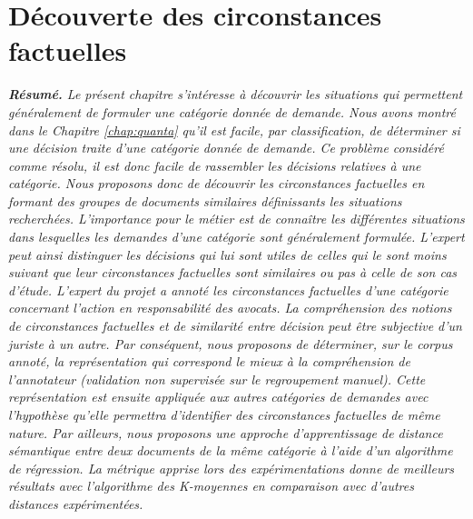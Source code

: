  \chapter{Découverte des circonstances factuelles}
\label{chap:similarite}

\textit{\small \textbf{Résumé.} Le présent chapitre s'intéresse à découvrir les situations qui permettent généralement de formuler une catégorie donnée de demande. Nous avons montré dans le Chapitre \ref{chap:quanta} qu'il est facile, par classification, de déterminer si une décision traite d'une catégorie donnée de demande. Ce problème considéré comme résolu, il est donc facile de rassembler les décisions relatives à une catégorie. Nous proposons donc de découvrir les circonstances factuelles en formant des groupes de documents similaires définissants les situations recherchées. L'importance pour le métier est de connaître les différentes situations dans lesquelles les demandes d'une catégorie sont généralement formulée. L'expert peut ainsi distinguer les décisions qui lui sont utiles de celles qui le sont moins suivant que leur circonstances factuelles sont similaires ou pas à celle de son cas d'étude. L'expert du projet a annoté les circonstances factuelles d'une catégorie concernant l'action en responsabilité des avocats. La compréhension des notions de circonstances factuelles et de similarité entre décision peut être subjective d'un juriste à un autre. Par conséquent, nous proposons de déterminer, sur le corpus annoté, la représentation qui correspond le mieux à la compréhension de l'annotateur (validation non supervisée sur le regroupement manuel). Cette représentation est ensuite appliquée aux autres catégories de demandes avec l'hypothèse qu'elle permettra d'identifier des circonstances factuelles de même nature. Par ailleurs, nous proposons une approche d'apprentissage de distance sémantique entre deux documents de la même catégorie à l'aide d'un algorithme de régression. La métrique apprise lors des expérimentations donne de meilleurs résultats avec l'algorithme des K-moyennes en comparaison avec d'autres distances expérimentées.}

